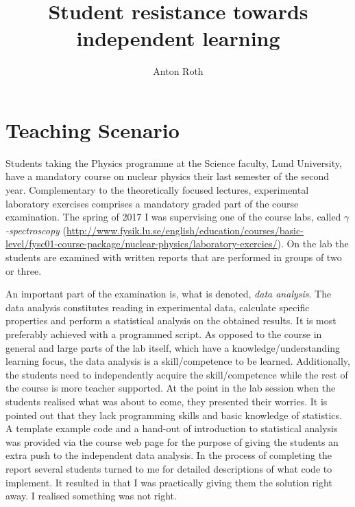 \documentclass[]{article}
\title{Student resistance towards independent learning}
\author{Anton Roth}
\begin{document}

\section*{Teaching Scenario}
Students taking the Physics programme at the Science faculty, Lund University, have a mandatory course on nuclear physics their last semester of the second year.
Complementary to the theoretically focused lectures, experimental laboratory exercises comprises a mandatory graded part of the course examination.
The spring of 2017 I was supervising one of the course labs, called {\it $\gamma$-spectroscopy} (\url{http://www.fysik.lu.se/english/education/courses/basic-level/fysc01-course-package/nuclear-physics/laboratory-exercies/}).
On the lab the students are examined with written reports that are performed in groups of two or three.

An important part of the examination is, what is denoted, {\it data analysis}.
The data analysis constitutes reading in experimental data, calculate specific properties and perform a statistical analysis on the obtained results.
It is most preferably achieved with a programmed script.
As opposed to the course in general and large parts of the lab itself, which have a knowledge/understanding learning focus, the data analysis is a skill/competence to be learned.
Additionally, the students need to independently acquire the skill/competence while the rest of the course is more teacher supported.
At the point in the lab session when the students realised what was about to come, they presented their worries.
It is pointed out that they lack programming skills and basic knowledge of statistics.
A template example code and a hand-out of introduction to statistical analysis was provided via the course web page for the purpose of giving the students an extra push to the independent data analysis.
In the process of completing the report several students turned to me for detailed descriptions of what code to implement.
It resulted in that I was practically giving them the solution right away.
I realised something was not right.
\end{document}
